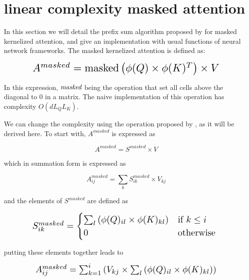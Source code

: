 \section{linear complexity masked attention}

In this section we will detail the prefix sum algorithm proposed by
\citet{choromanski2021rethinking} for
 masked kernelized attention, and give an implementation with usual
functions of neural network frameworks. The masked kernelized attention is defined as:

\begin{equation}
\resizebox{0.8\hsize}{!}{$
	A^{masked} = \mathrm{masked} \left( \phi(Q) \times \phi(K)^T \right) \times V
$}
\end{equation}

In this expression, $\emph{masked}$ being the operation that set all cells
 above the diagonal to 0 in a matrix. The naive implementation of this
 operation has complexity $O(dL_QL_K)$.

We can change the complexity using the operation proposed by
 \citet{choromanski2021rethinking}, as it will be derived  here.
 To start with, $A^{masked}$ is expressed as

\begin{equation}
A^{masked} = S^{masked} \times V
\end{equation}

\noindent{}which
in summation form is expressed as

\begin{equation}
A^{masked}_{ij} = \sum_k S^{masked}_{ik} \times V_{kj}
\end{equation}

\noindent{}and the
elements of $S^{masked}$ are defined as

\begin{equation}
	\resizebox{0.8\hsize}{!}{$
		S^{masked}_{ik} =
		\begin{cases}
		\sum_l \left( \phi(Q)_{il} \times \phi(K)_{kl} \right) & \text{if } k \leq i\\
		0 & \text{otherwise} 
		\end{cases}$
	}
\end{equation}

\noindent{}putting these elements together leads to

\begin{equation}
	\resizebox{0.8\hsize}{!}{
		$A^{masked}_{ij}= \sum_{k=1}^i \left( V_{kj} \times \sum_l \left( \phi(Q)_{il} \times \phi(K)_{kl} \right) \right)$
	}
\end{equation}

